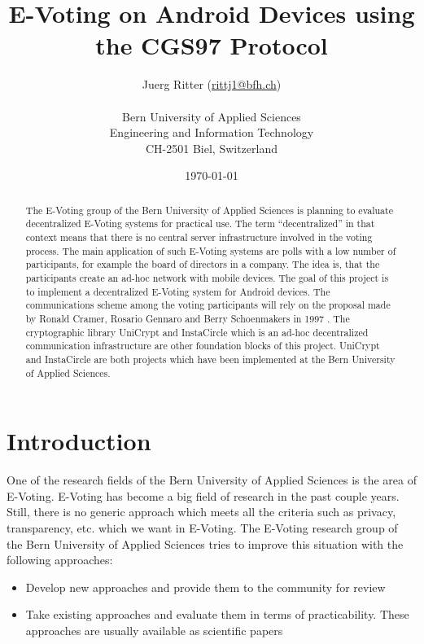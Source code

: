 \documentclass[numbers=noenddot, abstract=on, a4paper, headsepline,
footsepline, oneside, draft=off]{scrreprt}
\begin{document}
\title{\bf E-Voting on Android Devices using the CGS97 Protocol}
\subject{Master Thesis Proposal}
\author{Juerg Ritter (\url{rittj1@bfh.ch})\\
\\
Bern University of Applied Sciences\\
Engineering and Information Technology\\
CH-2501 Biel, Switzerland\\
}
\date{\today}
\publishers{Advisor:\\
Prof. Dr. Rolf Haenni, Bern University of Applied Sciences\\
\bigskip
Expert:\\
Stephan Neumann, Technical University of Darmstadt}
\maketitle



\begin{abstract}
The E-Voting group of the Bern University of Applied Sciences is planning to
evaluate decentralized E-Voting systems for practical use. The term
``decentralized'' in that context means that there is no central server
infrastructure involved in the voting process. The main application of such
E-Voting systems are polls with a low number of participants, for example the
board of directors in a company. The idea is, that the participants create an
ad-hoc network with mobile devices. The goal of this project is to implement a
decentralized E-Voting system for Android devices. The communications scheme among
the voting participants will rely on the proposal made by Ronald Cramer,
Rosario Gennaro and Berry Schoenmakers in 1997 \cite{CGS97}. The cryptographic
library UniCrypt and InstaCircle which is an ad-hoc decentralized communication infrastructure are
other foundation blocks of this project. UniCrypt and InstaCircle are both
projects which have been implemented at the Bern University of Applied Sciences.
\end{abstract}

\tableofcontents

\chapter{Introduction}
\label{cha:introduction}
One of the research fields of the Bern University of Applied Sciences is the
area of E-Voting. E-Voting has become a big field of research in the past couple
years. Still, there is no generic approach which meets all the criteria such as
privacy, transparency, etc. which we want in E-Voting. The E-Voting research
group of the Bern University of Applied Sciences \cite{www:EVG} tries to
improve this situation with the following approaches:
\begin{itemize}
  \item Develop new approaches and provide them to the community for review
  \item Take existing approaches and evaluate them in terms of practicability.
  These approaches are usually available as scientific papers
\end{itemize}
\end{document}
